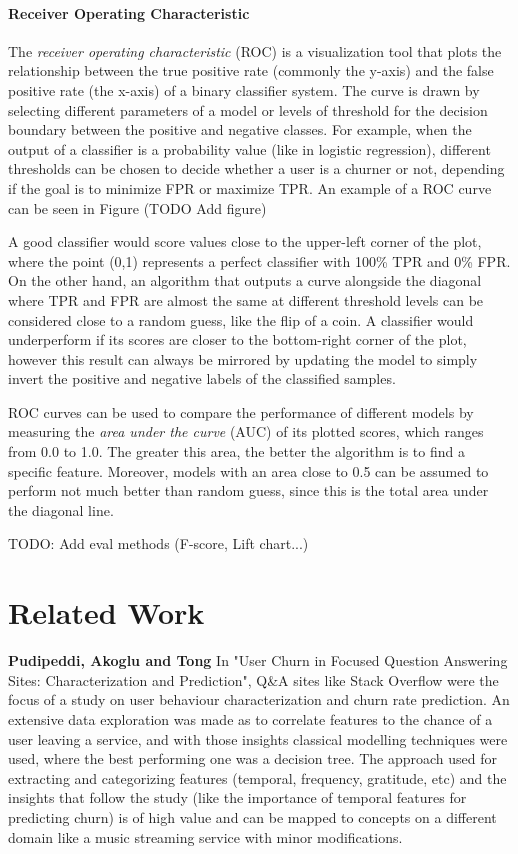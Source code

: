 \documentclass{kththesis}
\begin{document}
\subsubsection{Receiver Operating Characteristic}

The \emph{receiver operating characteristic} (ROC) is a visualization tool that plots the relationship between the true positive rate (commonly the y-axis) and the false positive rate (the x-axis) of a binary classifier system. The curve is drawn by selecting different parameters of a model or levels of threshold for the decision boundary between the positive and negative classes. For example, when the output of a classifier is a probability value (like in logistic regression), different thresholds can be chosen to decide whether a user is a churner or not, depending if the goal is to minimize FPR or maximize TPR. An example of a ROC curve can be seen in Figure (TODO Add figure)

A good classifier would score values close to the upper-left corner of the plot, where the point (0,1) represents a perfect classifier with 100\% TPR and 0\% FPR. On the other hand, an algorithm that outputs a curve alongside the diagonal where TPR and FPR are almost the same at different threshold levels can be considered close to a random guess, like the flip of a coin. A classifier would underperform if its scores are closer to the bottom-right corner of the plot, however this result can always be mirrored by updating the model to simply invert the positive and negative labels of the classified samples.

ROC curves can be used to compare the performance of different models by measuring the \emph{area under the curve} (AUC) of its plotted scores, which ranges from 0.0 to 1.0. The greater this area, the better the algorithm is to find a specific feature. Moreover, models with an area close to 0.5 can be assumed to perform not much better than random guess, since this is the total area under the diagonal line.

TODO: Add eval methods (F-score, Lift chart...)

\chapter{Related Work}

\textbf{Pudipeddi, Akoglu and Tong} \citep{Pudipeddi2014} In "User Churn in Focused Question Answering Sites: Characterization and Prediction", Q\&A sites like Stack Overflow were the focus of a study on user behaviour characterization and churn rate prediction. An extensive data exploration was made as to correlate features to the chance of a user leaving a service, and with those insights classical modelling techniques were used, where the best performing one was a decision tree. The approach used for extracting and categorizing features (temporal, frequency, gratitude, etc) and the insights that follow the study (like the importance of temporal features for predicting churn) is of high value and can be mapped to concepts on a different domain like a music streaming service with minor modifications.
\end{document}

